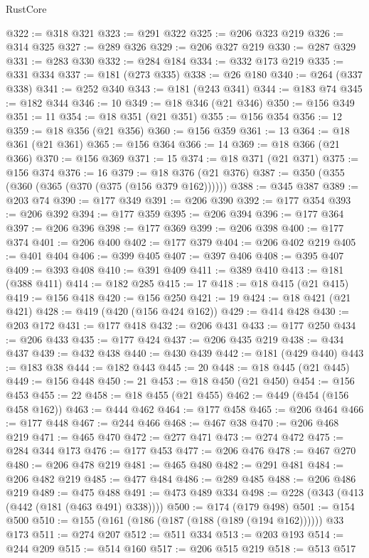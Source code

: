 \begin{lexlean}{RustCore}
\begin{coremodule}
@322 := @318 @321
@323 := @291 @322
@325 := @206 @323 @219
@326 := @314 @325
@327 := @289 @326
@329 := @206 @327 @219
@330 := @287 @329
@331 := @283 @330
@332 := @284 @184
@334 := @332 @173 @219
@335 := @331 @334
@337 := @181 (@273 @335)
@338 := @26 @180
@340 := @264 (@337 @338)
@341 := @252 @340
@343 := @181 (@243 @341)
@344 := @183 @74
@345 := @182 @344
@346 := 10
@349 := @18 @346 (@21 @346)
@350 := @156 @349
@351 := 11
@354 := @18 @351 (@21 @351)
@355 := @156 @354
@356 := 12
@359 := @18 @356 (@21 @356)
@360 := @156 @359
@361 := 13
@364 := @18 @361 (@21 @361)
@365 := @156 @364
@366 := 14
@369 := @18 @366 (@21 @366)
@370 := @156 @369
@371 := 15
@374 := @18 @371 (@21 @371)
@375 := @156 @374
@376 := 16
@379 := @18 @376 (@21 @376)
@387 := @350 (@355 (@360 (@365 (@370 (@375 (@156 @379 @162))))))
@388 := @345 @387
@389 := @203 @74
@390 := @177 @349
@391 := @206 @390
@392 := @177 @354
@393 := @206 @392
@394 := @177 @359
@395 := @206 @394
@396 := @177 @364
@397 := @206 @396
@398 := @177 @369
@399 := @206 @398
@400 := @177 @374
@401 := @206 @400
@402 := @177 @379
@404 := @206 @402 @219
@405 := @401 @404
@406 := @399 @405
@407 := @397 @406
@408 := @395 @407
@409 := @393 @408
@410 := @391 @409
@411 := @389 @410
@413 := @181 (@388 @411)
@414 := @182 @285
@415 := 17
@418 := @18 @415 (@21 @415)
@419 := @156 @418
@420 := @156 @250
@421 := 19
@424 := @18 @421 (@21 @421)
@428 := @419 (@420 (@156 @424 @162))
@429 := @414 @428
@430 := @203 @172
@431 := @177 @418
@432 := @206 @431
@433 := @177 @250
@434 := @206 @433
@435 := @177 @424
@437 := @206 @435 @219
@438 := @434 @437
@439 := @432 @438
@440 := @430 @439
@442 := @181 (@429 @440)
@443 := @183 @38
@444 := @182 @443
@445 := 20
@448 := @18 @445 (@21 @445)
@449 := @156 @448
@450 := 21
@453 := @18 @450 (@21 @450)
@454 := @156 @453
@455 := 22
@458 := @18 @455 (@21 @455)
@462 := @449 (@454 (@156 @458 @162))
@463 := @444 @462
@464 := @177 @458
@465 := @206 @464
@466 := @177 @448
@467 := @244 @466
@468 := @467 @38
@470 := @206 @468 @219
@471 := @465 @470
@472 := @277 @471
@473 := @274 @472
@475 := @284 @344 @173
@476 := @177 @453
@477 := @206 @476
@478 := @467 @270
@480 := @206 @478 @219
@481 := @465 @480
@482 := @291 @481
@484 := @206 @482 @219
@485 := @477 @484
@486 := @289 @485
@488 := @206 @486 @219
@489 := @475 @488
@491 := @473 @489 @334
@498 := @228 (@343 (@413 (@442 (@181 (@463 @491) @338))))
@500 := @174 (@179 @498)
@501 := @154 @500
@510 := @155 (@161 (@186 (@187 (@188 (@189 (@194 @162)))))) @33 @173
@511 := @274 @207
@512 := @511 @334
@513 := @203 @193
@514 := @244 @209
@515 := @514 @160
@517 := @206 @515 @219
@518 := @513 @517

\end{coremodule}
\end{lexlean}
